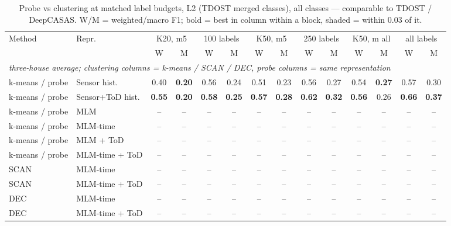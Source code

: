 \begin{table}[H]
\centering\small
\caption{Probe vs clustering at matched label budgets, L2 (TDOST merged classes), all classes --- comparable to TDOST / DeepCASAS. W/M = weighted/macro F1; bold = best in column within a block, shaded = within 0.03 of it.}
\label{tab:cmp_l2_all}
\setlength{\tabcolsep}{3.5pt}
\begin{tabular}{llcc|cc|cc|cc|cc|cc}
\toprule
Method & Repr. & \multicolumn{2}{c}{K20, m5} & \multicolumn{2}{c}{100 labels} & \multicolumn{2}{c}{K50, m5} & \multicolumn{2}{c}{250 labels} & \multicolumn{2}{c}{K50, m all} & \multicolumn{2}{c}{all labels} \\
\cmidrule(lr){3-4}\cmidrule(lr){5-6}\cmidrule(lr){7-8}\cmidrule(lr){9-10}\cmidrule(lr){11-12}\cmidrule(lr){13-14}
 & & W & M & W & M & W & M & W & M & W & M & W & M \\
\midrule
\multicolumn{14}{l}{\textit{three-house average; clustering columns = k-means / SCAN / DEC, probe columns = same representation}} \\
\midrule
k-means / probe & Sensor hist. & 0.40 & \cellcolor{blue!12}\textbf{0.20} & \cellcolor{blue!12}0.56 & \cellcolor{blue!12}0.24 & 0.51 & 0.23 & 0.56 & 0.27 & \cellcolor{blue!12}0.54 & \cellcolor{blue!12}\textbf{0.27} & 0.57 & 0.30 \\
k-means / probe & Sensor+ToD hist. & \cellcolor{blue!12}\textbf{0.55} & \cellcolor{blue!12}\textbf{0.20} & \cellcolor{blue!12}\textbf{0.58} & \cellcolor{blue!12}\textbf{0.25} & \cellcolor{blue!12}\textbf{0.57} & \cellcolor{blue!12}\textbf{0.28} & \cellcolor{blue!12}\textbf{0.62} & \cellcolor{blue!12}\textbf{0.32} & \cellcolor{blue!12}\textbf{0.56} & \cellcolor{blue!12}0.26 & \cellcolor{blue!12}\textbf{0.66} & \cellcolor{blue!12}\textbf{0.37} \\
\cmidrule{1-14}
k-means / probe & MLM & -- & -- & -- & -- & -- & -- & -- & -- & -- & -- & -- & -- \\
k-means / probe & MLM-time & -- & -- & -- & -- & -- & -- & -- & -- & -- & -- & -- & -- \\
k-means / probe & MLM + ToD & -- & -- & -- & -- & -- & -- & -- & -- & -- & -- & -- & -- \\
k-means / probe & MLM-time + ToD & -- & -- & -- & -- & -- & -- & -- & -- & -- & -- & -- & -- \\
\cmidrule{1-14}
SCAN & MLM-time & -- & -- & -- & -- & -- & -- & -- & -- & -- & -- & -- & -- \\
SCAN & MLM-time + ToD & -- & -- & -- & -- & -- & -- & -- & -- & -- & -- & -- & -- \\
\cmidrule{1-14}
DEC & MLM-time & -- & -- & -- & -- & -- & -- & -- & -- & -- & -- & -- & -- \\
DEC & MLM-time + ToD & -- & -- & -- & -- & -- & -- & -- & -- & -- & -- & -- & -- \\
\bottomrule
\end{tabular}
\end{table}
